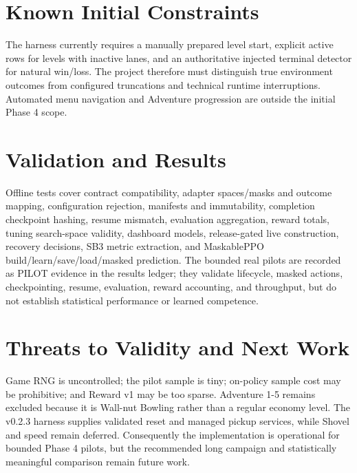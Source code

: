 \documentclass[11pt,a4paper]{article}
\begin{document}
\section{Known Initial Constraints}
The harness currently requires a manually prepared level start, explicit active rows for levels with inactive lanes, and an authoritative injected terminal detector for natural win/loss. The project therefore must distinguish true environment outcomes from configured truncations and technical runtime interruptions. Automated menu navigation and Adventure progression are outside the initial Phase 4 scope.

\section{Validation and Results}
Offline tests cover contract compatibility, adapter spaces/masks and outcome mapping, configuration rejection, manifests and immutability, completion checkpoint hashing, resume mismatch, evaluation aggregation, reward totals, tuning search-space validity, dashboard models, release-gated live construction, recovery decisions, SB3 metric extraction, and MaskablePPO build/learn/save/load/masked prediction. The bounded real pilots are recorded as PILOT evidence in the results ledger; they validate lifecycle, masked actions, checkpointing, resume, evaluation, reward accounting, and throughput, but do not establish statistical performance or learned competence.

\section{Threats to Validity and Next Work}
Game RNG is uncontrolled; the pilot sample is tiny; on-policy sample cost may be prohibitive; and Reward v1 may be too sparse. Adventure 1-5 remains excluded because it is Wall-nut Bowling rather than a regular economy level. The v0.2.3 harness supplies validated reset and managed pickup services, while Shovel and speed remain deferred. Consequently the implementation is operational for bounded Phase 4 pilots, but the recommended long campaign and statistically meaningful comparison remain future work.
\end{document}
